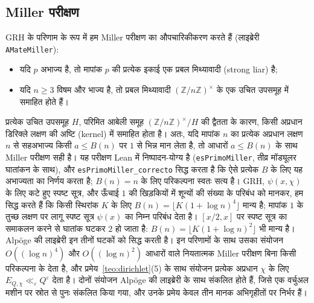 \documentclass[11pt,a4paper]{amsart}
\theoremstyle{definition}
\theoremstyle{remark}
\begin{document}
\subsection*{Miller परीक्षण}
GRH के परिणाम के रूप में हम Miller परीक्षण का औपचारिकीकरण करते हैं (लाइब्रेरी \texttt{AMateMiller}):
\begin{itemize}
\item यदि $p$ अभाज्य है, तो मापांक $p$ की प्रत्येक इकाई एक प्रबल मिथ्यावादी (strong liar) है;
\item यदि $n\ge3$ विषम और भाज्य है, तो प्रबल मिथ्यावादी $(\mathbb Z/n\mathbb Z)^\times$ के एक उचित उपसमूह में समाहित होते हैं।
\end{itemize}
प्रत्येक उचित उपसमूह $H$, परिमित आबेली समूह $(\mathbb Z/n\mathbb Z)^\times/H$ की द्वैतता के कारण, किसी अप्रधान डिरिक्ले लक्षण की अष्टि (kernel) में समाहित होता है। अतः, यदि मापांक $n$ का प्रत्येक अप्रधान लक्षण $n$ से सहअभाज्य किसी $a\le B(n)$ पर $1$ से भिन्न मान लेता है, तो आधारों $a\le B(n)$ के साथ Miller परीक्षण सही है। यह परीक्षण Lean में निष्पादन-योग्य है (\texttt{esPrimoMiller}, तीव्र मॉड्यूलर घातांकन के साथ), और \texttt{esPrimoMiller\_correcto} सिद्ध करता है कि ऐसे प्रत्येक $B$ के लिए यह अभाज्यता का निर्णय करता है; $B(n)=n$ के लिए परिकल्पना स्वतः सत्य है। GRH, $\psi(x,\chi)$ के लिए कटे हुए स्पष्ट सूत्र, और ऊँचाई $1$ की खिड़कियों में शून्यों की संख्या के परिबंध को मानकर, हम सिद्ध करते हैं कि किसी स्थिरांक $K$ के लिए $B(n)=\lfloor K(1+\log n)^4\rfloor$ मान्य है; मापांक $1$ के तुच्छ लक्षण पर लागू स्पष्ट सूत्र $\psi(x)$ का निम्न परिबंध देता है। $[x/2,x]$ पर स्पष्ट सूत्र का समाकलन करने से घातांक घटकर $2$ हो जाता है: $B(n)=\lfloor K(1+\log n)^2\rfloor$ भी मान्य है। Alp\"oge की लाइब्रेरी इन तीनों घटकों को सिद्ध करती है। इन परिणामों के साथ उसका संयोजन $O((\log n)^4)$ और $O((\log n)^2)$ आधारों वाले नियतात्मक Miller परीक्षण बिना किसी परिकल्पना के देता है, और प्रमेय~\ref{teo:dirichlet}(5) के साथ संयोजन प्रत्येक अप्रधान $\chi$ के लिए $E_{Q,\chi}\ll_\varepsilon Q^\varepsilon$ देता है। दोनों संयोजन Alp\"oge की लाइब्रेरी के साथ संकलित होते हैं, जिसे एक वर्चुअल मशीन पर स्रोत से पुनः संकलित किया गया, और उनके प्रमेय केवल तीन मानक अभिगृहीतों पर निर्भर हैं।
\end{document}
